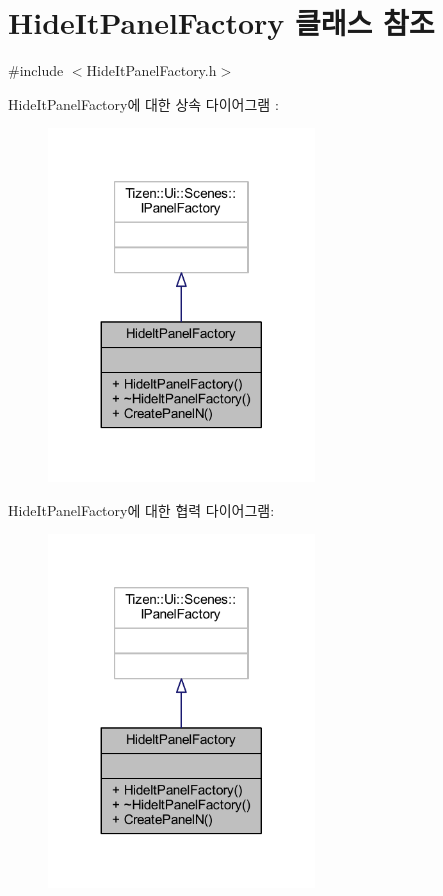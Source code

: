\hypertarget{class_hide_it_panel_factory}{\section{Hide\+It\+Panel\+Factory 클래스 참조}
\label{class_hide_it_panel_factory}
}


{\ttfamily \#include $<$Hide\+It\+Panel\+Factory.\+h$>$}



Hide\+It\+Panel\+Factory에 대한 상속 다이어그램 \+: 
\nopagebreak
\begin{figure}[H]
\begin{center}
\leavevmode
\includegraphics[width=200pt]{class_hide_it_panel_factory__inherit__graph}
\end{center}
\end{figure}


Hide\+It\+Panel\+Factory에 대한 협력 다이어그램\+:
\nopagebreak
\begin{figure}[H]
\begin{center}
\leavevmode
\includegraphics[width=200pt]{class_hide_it_panel_factory__coll__graph}
\end{center}
\end{figure}
